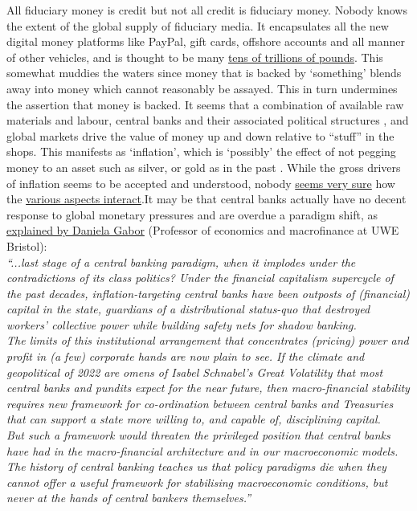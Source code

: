 All fiduciary money is credit but not all credit is fiduciary money. Nobody knows the extent of the global supply of fiduciary media. It encapsulates all the new digital money platforms like PayPal, gift cards, offshore accounts and all manner of other vehicles, and is thought to be many \href{https://www.bis.org/publ/qtrpdf/r_qt2212h.pdf}{tens of trillions of pounds}\cite{borio2017fx}. This somewhat muddies the waters since money that is backed by `something' blends away into money which cannot reasonably be assayed. This in turn undermines the assertion that money is backed. It seems that a combination of available raw materials and labour, central banks and their associated political structures \cite{barsky1987fisher}, and global markets drive the value of money up and down relative to ``stuff'' in the shops. This manifests as `inflation', which is `possibly' the effect of not pegging money to an asset such as silver, or gold as in the past \cite{hall2009inflation}. While the gross drivers of inflation seems to be accepted and understood, nobody \href{https://www.dailymail.co.uk/news/article-10966165/Jerome-Powell-admits-understand-better-little-understand-inflation.html}{seems very sure} how the \href{https://www.bloomberg.com/opinion/articles/2022-08-19/this-economy-is-proving-too-complicated-for-economists}{various aspects interact}.It may be that central banks actually have no decent response to global monetary pressures and are overdue a paradigm shift, as \href{https://www.ft.com/content/2d79d153-fffa-4441-b79f-0a808a51108f}{explained by Daniela Gabor} (Professor of economics and macrofinance at UWE Bristol):\\ 
\textit{``...last stage of a central banking paradigm, when it implodes under the contradictions of its class politics? Under the financial capitalism supercycle of the past decades, inflation-targeting central banks have been outposts of (financial) capital in the state, guardians of a distributional status-quo that destroyed workers’ collective power while building safety nets for shadow banking.\\
The limits of this institutional arrangement that concentrates (pricing) power and profit in (a few) corporate hands are now plain to see. If the climate and geopolitical of 2022 are omens of Isabel Schnabel’s Great Volatility that most central banks and pundits expect for the near future, then macro-financial stability requires new framework for co-ordination between central banks and Treasuries that can support a state more willing to, and capable of, disciplining capital.\\
But such a framework would threaten the privileged position that central banks have had in the macro-financial architecture and in our macroeconomic models. The history of central banking teaches us that policy paradigms die when they cannot offer a useful framework for stabilising macroeconomic conditions, but never at the hands of central bankers themselves.''}\par
